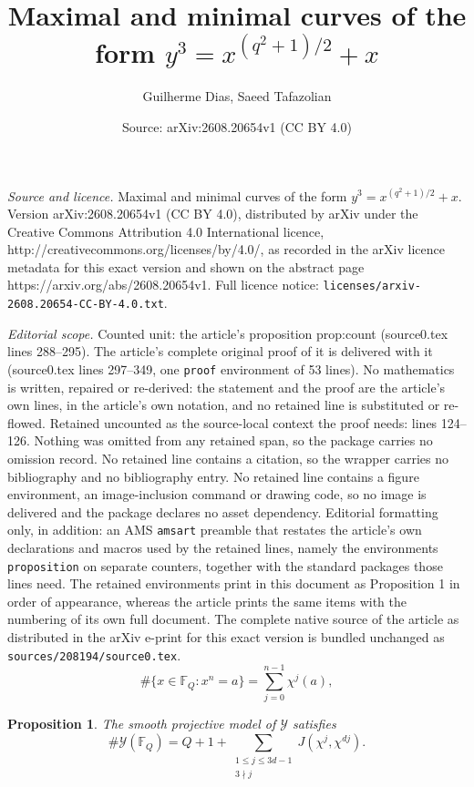 \documentclass[10pt,a4paper]{amsart}
\title{Maximal and minimal curves of the form $y^3=x^{(q^2+1)/2}+x$}
\author{Guilherme Dias, Saeed Tafazolian}
\date{Source: arXiv:2608.20654v1 (CC BY 4.0)}
\newtheorem{proposition}{Proposition}
\newcommand{\F}{\mathbb{F}}
\newcommand{\cY}{\mathcal{Y}}
\begin{document}
\maketitle

\noindent\emph{Source and licence.} Maximal and minimal curves of the form $y^3=x^{(q^2+1)/2}+x$. Version arXiv:2608.20654v1 (CC BY 4.0), distributed by arXiv under the Creative Commons Attribution 4.0 International licence, http://creativecommons.org/licenses/by/4.0/, as recorded in the arXiv licence metadata for this exact version and shown on the abstract page https://arxiv.org/abs/2608.20654v1. Full licence notice: \texttt{licenses/arxiv-2608.20654-CC-BY-4.0.txt}.\par\smallskip

\noindent\textit{Editorial scope.} Counted unit: the article's proposition prop:count (source0.tex lines 288--295). The article's complete original proof of it is delivered with it (source0.tex lines 297--349, one \texttt{proof} environment of 53 lines). No mathematics is written, repaired or re-derived: the statement and the proof are the article's own lines, in the article's own notation, and no retained line is substituted or re-flowed.  Retained uncounted as the source-local context the proof needs: lines 124--126.  Nothing was omitted from any retained span, so the package carries no omission record.  No retained line contains a citation, so the wrapper carries no bibliography and no bibliography entry.  No retained line contains a figure environment, an image-inclusion command or drawing code, so no image is delivered and the package declares no asset dependency.  Editorial formatting only, in addition: an AMS \texttt{amsart} preamble that restates the article's own declarations and macros used by the retained lines, namely the environments \texttt{proposition} on separate counters, together with the standard packages those lines need.  The retained environments print in this document as Proposition 1 in order of appearance, whereas the article prints the same items with the numbering of its own full document.  The complete native source of the article as distributed in the arXiv e-print for this exact version is bundled unchanged as \texttt{sources/208194/source0.tex}.
\begin{equation}\label{eq:roots}
\#\{x\in\F_Q:x^n=a\}=\sum_{j=0}^{n-1}\chi^j(a),
\end{equation}

\begin{proposition}\label{prop:count}
The smooth projective model of $\cY$ satisfies
\begin{equation}\label{eq:pointcount}
\#\cY(\F_Q)=Q+1+
\sum_{\substack{1\le j\le 3d-1\\3\nmid j}}
J(\chi^j,\chi^{dj}).
\end{equation}
\end{proposition}
\end{document}
